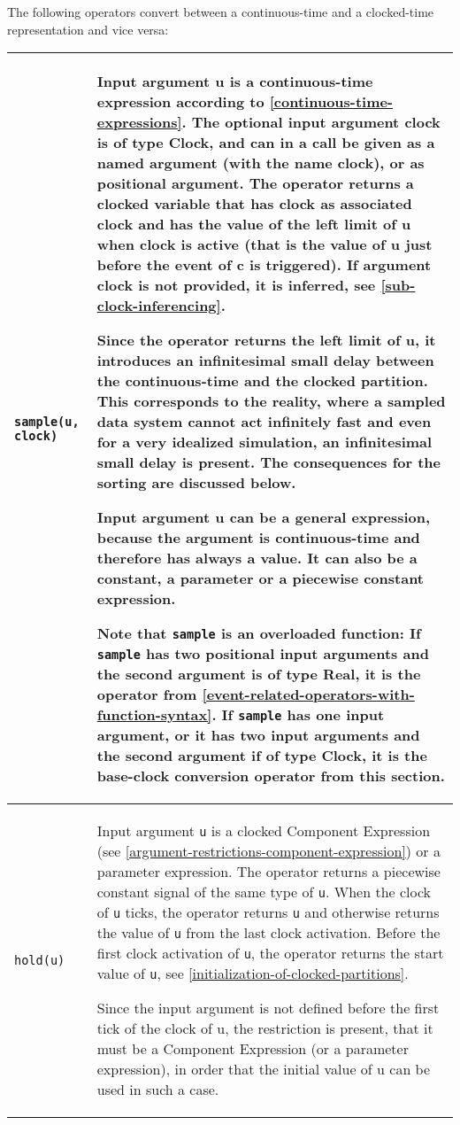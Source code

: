 The following operators convert between a continuous-time and a
clocked-time representation and vice versa:
\begin{longtable}[]{|l|p{12cm}|}
\hline \endhead
\lstinline!sample(u, clock)! &
Input argument u is a continuous-time expression according to
\cref{continuous-time-expressions}. The optional input argument clock is of type Clock, and can in a call be given as a named argument (with the name clock),
or as positional argument.
The operator
returns a clocked variable that has clock as associated clock and has the
value of the left limit of u when clock is active (that is the value of u
just before the event of c is triggered). If argument clock is not provided,
it is inferred, see \cref{sub-clock-inferencing}.
\par
\begin{nonnormative*}
Since the operator returns the left limit of u, it introduces
an infinitesimal small delay between the continuous-time and the clocked
partition. This corresponds to the reality, where a sampled data system
cannot act infinitely fast and even for a very idealized simulation, an
infinitesimal small delay is present. The consequences for the sorting
are discussed below.

Input argument u can be a general expression, because the argument
is continuous-time and therefore has always a value. It can also be a
constant, a parameter or a piecewise constant expression.

Note that \lstinline!sample! is an overloaded function: If
\lstinline!sample! has two positional input arguments and the second argument is
of type Real, it is the operator from \cref{event-related-operators-with-function-syntax}. If
\lstinline!sample! has one input argument, or it has two input
arguments and the second argument if of type Clock, it is the base-clock
conversion operator from this section.
\end{nonnormative*}
\\ \hline
\lstinline!hold(u)! &
Input argument \lstinline!u! is a clocked Component Expression (see \cref{argument-restrictions-component-expression}) or a parameter expression.  The operator returns a piecewise constant
signal of the same type of \lstinline!u!.  When the clock of \lstinline!u! ticks, the operator returns \lstinline!u! and otherwise returns the value of \lstinline!u! from the last clock activation.
Before the first clock activation of \lstinline!u!, the operator returns the start value of \lstinline!u!, see \cref{initialization-of-clocked-partitions}.
\par
\begin{nonnormative*}
Since the input argument is not defined before the first tick of the clock of u, the restriction is present, that it must be a Component Expression (or a parameter expression),
in order that the initial value of u can be used in such a case.
\end{nonnormative*}
\\ \hline
\end{longtable}

